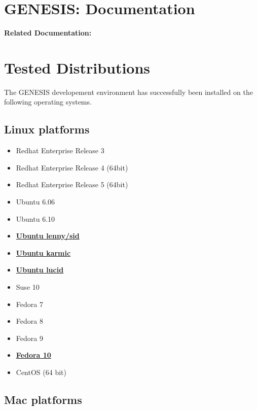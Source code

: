 \documentclass[12pt]{article}
\begin{document}
\section*{GENESIS: Documentation}

{\bf Related Documentation:}

\section*{Tested Distributions}

The GENESIS developement environment has successfully been installed on the following operating systems.

\subsection*{Linux platforms}

\begin{itemize}
\item Redhat Enterprise Release 3
\item Redhat Enterprise Release 4 (64bit)
\item Redhat Enterprise Release 5 (64bit)
\item Ubuntu 6.06
\item Ubuntu 6.10
\item \href{../installation-ubuntu-lennysid/installation-ubuntu-lennysid.tex}{\bf Ubuntu lenny/sid}
\item \href{../installation-ubuntu-karmic/installation-ubuntu-karmic.tex}{\bf Ubuntu karmic}
\item \href{../installation-ubuntu-lucid/installation-ubuntu-lucid.tex}{\bf Ubuntu lucid}
\item Suse 10
\item Fedora 7
\item Fedora 8
\item Fedora 9
\item \href{../installation-fedora10/installation-fedora10.tex}{\bf Fedora 10}
\item CentOS (64 bit)%
\end{itemize}

\subsection*{Mac platforms}
\end{document}
